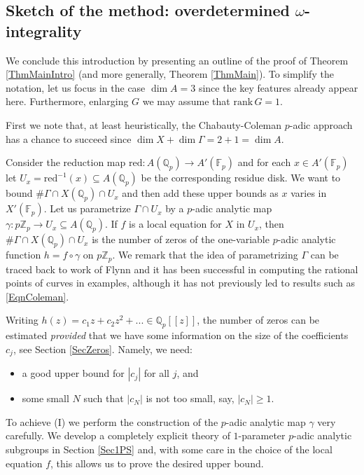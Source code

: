 \documentclass[11pt]{amsart}
\theoremstyle{remark}
\numberwithin{equation}{section}
\newcommand{\Z}{\mathbb{Z}}
\newcommand{\F}{\mathbb{F}}
\newcommand{\Q}{\mathbb{Q}}
\newcommand{\rk}{\mathrm{rank}\,}
\newcommand{\red}{\mathrm{red}}
\begin{document}

\subsection{Sketch of the method: overdetermined $\omega$-integrality}\label{SecIntroMethods} We conclude this introduction by presenting an outline of the proof of Theorem \ref{ThmMainIntro} (and more generally, Theorem \ref{ThmMain}). To simplify the notation, let us focus in the case $\dim A=3$ since the key features already appear here. Furthermore, enlarging $G$ we may assume that $\rk G=1$.

First we note that, at least heuristically, the Chabauty-Coleman $p$-adic approach has a chance to succeed since $\dim X+ \dim \Gamma= 2+1=\dim A$. 



Consider the reduction map $\red:A(\Q_p)\to A'(\F_p)$ and for each $x\in A'(\F_p)$ let  $U_x=\red^{-1}(x)\subseteq A(\Q_p)$ be the corresponding residue disk. We want to bound $\# \Gamma\cap X(\Q_p)\cap U_x$ and then add these upper bounds as $x$ varies in $X'(\F_p)$. Let us parametrize $\Gamma\cap U_x$ by a $p$-adic analytic map $\gamma : p\Z_p\to U_x\subseteq A(\Q_p)$. If $f$ is a local equation for $X$ in $U_x$, then $\#\Gamma\cap X(\Q_p)\cap U_x$ is the number of zeros of the one-variable $p$-adic analytic function $h=f\circ \gamma$ on $p\Z_p$. We remark that the idea of parametrizing $\Gamma$ can be traced back to work of Flynn \cite{Flyn} and it has been successful in computing the rational points of curves in examples, although it has not previously led to results such as \eqref{EqnColeman}.


Writing $h(z)=c_1z+c_2z^2+...\in \Q_p[[z]]$, the number of zeros can be estimated  \emph{provided} that we have some information on the size of the coefficients $c_j$, see Section \ref{SecZeros}. Namely,  we need:
\begin{itemize} 
\item[(I)] a good upper bound for $|c_j|$ for all $j$, and 
\item[(II)] some small $N$ such that $|c_N|$ is not too small, say, $|c_N|\ge 1$.
\end{itemize}
To achieve (I) we perform the construction of the $p$-adic analytic map $\gamma$ very carefully. We develop a completely explicit theory of $1$-parameter $p$-adic analytic subgroups in Section \ref{Sec1PS} and, with some care in the choice of the local equation $f$, this allows us to prove the desired upper bound. 
\end{document}
